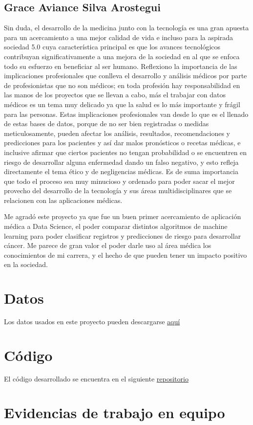 \documentclass[journal]{IEEEtran}                                                          %
\begin{document}
        \subsection{Grace Aviance Silva Arostegui}

            Sin duda, el desarrollo de la medicina junto con la tecnología es una gran apuesta para un acercamiento a una mejor calidad de vida e incluso para la aspirada sociedad 5.0 cuya característica principal es que los avances tecnológicos contribuyan significativamente a una mejora de la sociedad en al que se enfoca todo su esfuerzo en beneficiar al ser humano. Reflexiono la importancia de las implicaciones profesionales que conlleva el desarrollo y análisis médicos por parte de profesionistas que no son médicos; en toda profesión hay responsabilidad en las manos de los proyectos que se llevan a cabo, más el trabajar con datos médicos es un tema muy delicado ya que la salud es lo más importante y frágil para las personas. Estas implicaciones profesionales van desde lo que es el llenado de estas bases de datos, porque de no ser bien registradas o medidas meticulosamente, pueden afectar los análisis, resultados, recomendaciones y predicciones para los pacientes y así dar malos pronósticos o recetas médicas, e inclusive afirmar que ciertos pacientes no tengan probabilidad o se encuentren en riesgo de desarrollar alguna enfermedad dando un falso negativo, y esto refleja directamente el tema ético y de negligencias médicas. Es de suma importancia que todo el proceso sea muy minucioso y ordenado para poder sacar el mejor provecho del desarrollo de la tecnología y sus áreas multidisciplinares que se relacionen con las aplicaciones médicas.

            Me agradó este proyecto ya que fue un buen primer acercamiento de aplicación médica a Data Science, el poder comparar distintos algoritmos de machine learning para poder clasificar registros y predicciones de riesgo para desarrollar cáncer. Me parece de gran valor el poder darle uso al área médica los conocimientos de mi carrera, y el hecho de que pueden tener un impacto positivo en la sociedad.
        
    \appendices
    
    \section{Datos} \label{data}

        Los datos usados en este proyecto pueden descargarse \href{https://www.kaggle.com/code/ravaliraj/risk-classification-of-cervical-cancer}{aquí}

    \section{Código}

        El código desarrollado se encuentra en el siguiente \href{https://github.com/JuanEcheagaray75/cancer-clf}{repositorio}
    \section{Evidencias de trabajo en equipo}

    
    
\end{document}
